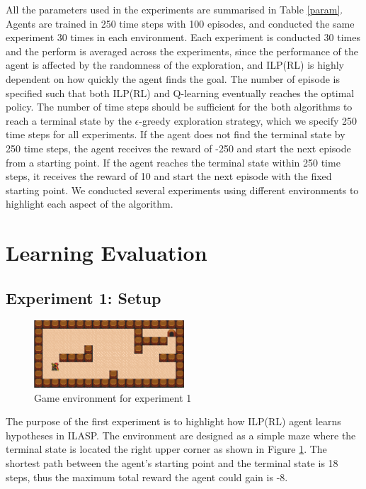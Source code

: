 All the parameters used in the experiments are summarised in Table \ref{param}.
Agents are trained in 250 time steps with 100 episodes, and conducted the same experiment 30 times in each environment. 
Each experiment is conducted 30 times and the perform is averaged across the experiments, 
since the performance of the agent is affected by the randomness of the exploration,
and ILP(RL) is highly dependent on how quickly the agent finds the goal.
The number of episode is specified such that both ILP(RL) and Q-learning eventually reaches the optimal policy.
The number of time steps should be sufficient for the both algorithms to reach a terminal state by the $\epsilon$-greedy exploration strategy, 
which we specify 250 time steps for all experiments. 
If the agent does not find the terminal state by 250 time steps, the agent receives the reward of -250 and 
start the next episode from a starting point. If the agent reaches the terminal state within 250 time steps, 
it receives the reward of 10 and start the next episode with the fixed starting point. 
We conducted several experiments using different environments to highlight each aspect of the algorithm.
\section{Learning Evaluation}
\label{sec:learning_evaluation}

\subsection{Experiment 1: Setup}
\label{subsec:experiement1_setup}

\begin{figure}[!htb]
\centering
\includegraphics[width=0.5\textwidth]{./figures/experiment1}
\caption{Game environment for experiment 1}
\label{fig:experiment1}
\end{figure}
    
The purpose of the first experiment is to highlight how ILP(RL) agent learns hypotheses in ILASP.
The environment are designed as a simple maze where the terminal state is located the right upper corner as shown in Figure \ref{fig:experiment1}.
The shortest path between the agent's starting point and the terminal state is 18 steps, thus the maximum total reward the agent could gain is -8.
    
